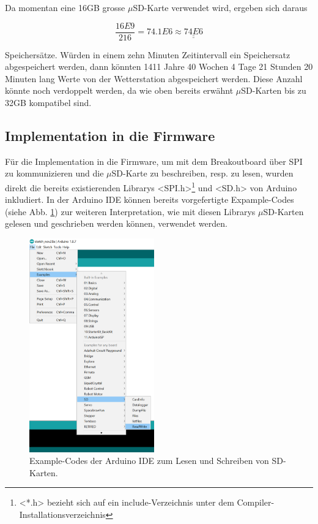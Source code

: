 Da momentan eine 16GB grosse $\mu$SD-Karte verwendet wird, ergeben sich daraus

\begin{equation}
\dfrac{16E9}{216}=74.1E6 \approx \underline{\underline{74E6}}
\end{equation}

Speichersätze. Würden in einem zehn Minuten Zeitintervall ein Speichersatz abgespeichert werden, dann könnten 1411 Jahre 40 Wochen 4 Tage 21 Stunden 20 Minuten lang Werte von der Wetterstation abgespeichert werden. Diese Anzahl könnte noch verdoppelt werden, da wie oben bereits erwähnt $\mu$SD-Karten bis zu 32GB kompatibel sind.\\

\newpage

\subsection{Implementation in die Firmware}
Für die Implementation in die Firmware, um mit dem Breakoutboard über SPI zu kommunizieren und die $\mu$SD-Karte zu beschreiben, resp. zu lesen, wurden direkt die bereits existierenden Librarys <SPI.h>\footnote{ <*.h> bezieht sich auf ein include-Verzeichnis unter dem Compiler-Installationsverzeichnis} und <SD.h> von Arduino inkludiert. In der Arduino IDE können bereits vorgefertigte Expample-Codes (siehe Abb. \ref{fig:exampleCodes}) zur weiteren Interpretation, wie mit diesen Librarys $\mu$SD-Karten gelesen und geschrieben werden können, verwendet werden.\\
\begin{figure}[h]
\centering
\includegraphics[width=0.48\textwidth]{graphics/Datenspeicherung/read_write_examples.PNG}
\caption{Example-Codes der Arduino IDE zum Lesen und Schreiben von SD-Karten.}
\label{fig:exampleCodes}
\end{figure}

